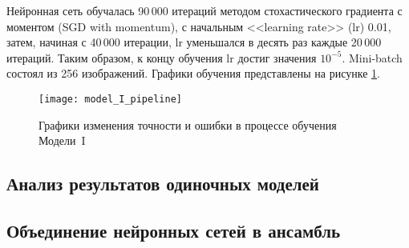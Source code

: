 Нейронная сеть обучалась 90\,000 итераций методом стохастического градиента с моментом (SGD with momentum),
с начальным <<learning rate>> (lr) 0.01, затем, начиная с 40\,000 итерации, lr уменьшался в десять раз каждые 20\,000 итераций.
Таким образом, к концу обучения lr достиг значения $10^{-5}$. Mini-batch состоял из 256 изображений. Графики обучения представлены
на рисунке \ref{fig:model_I_pipeline}.

\begin{figure}[H]
    \centering
    \texttt{[image: model\_I\_pipeline]}
    \caption{Графики изменения точности и ошибки в процессе обучения Модели~I}
    \label{fig:model_I_pipeline}
\end{figure}

\subsection{Анализ результатов одиночных моделей}
\subsection{Объединение нейронных сетей в ансамбль}